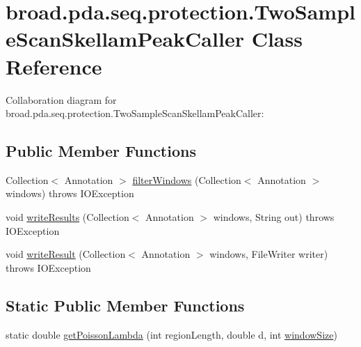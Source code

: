 \hypertarget{classbroad_1_1pda_1_1seq_1_1protection_1_1_two_sample_scan_skellam_peak_caller}{\section{broad.\+pda.\+seq.\+protection.\+Two\+Sample\+Scan\+Skellam\+Peak\+Caller Class Reference}
\label{classbroad_1_1pda_1_1seq_1_1protection_1_1_two_sample_scan_skellam_peak_caller}
}


Collaboration diagram for broad.\+pda.\+seq.\+protection.\+Two\+Sample\+Scan\+Skellam\+Peak\+Caller\+:
\subsection*{Public Member Functions}
\begin{DoxyCompactItemize}
\item 
Collection$<$ Annotation $>$ \hyperlink{classbroad_1_1pda_1_1seq_1_1protection_1_1_two_sample_scan_skellam_peak_caller_a91b82529c1440816b8ac2894162f2066}{filter\+Windows} (Collection$<$ Annotation $>$ windows)  throws I\+O\+Exception 
\item 
void \hyperlink{classbroad_1_1pda_1_1seq_1_1protection_1_1_two_sample_scan_skellam_peak_caller_ab416e62ed4dba266ac883e8d93726462}{write\+Results} (Collection$<$ Annotation $>$ windows, String out)  throws I\+O\+Exception 
\item 
void \hyperlink{classbroad_1_1pda_1_1seq_1_1protection_1_1_two_sample_scan_skellam_peak_caller_ac55e396e1b3dee42bc3babb6b06845ea}{write\+Result} (Collection$<$ Annotation $>$ windows, File\+Writer writer)  throws I\+O\+Exception 
\end{DoxyCompactItemize}
\subsection*{Static Public Member Functions}
\begin{DoxyCompactItemize}
\item 
static double \hyperlink{classbroad_1_1pda_1_1seq_1_1protection_1_1_two_sample_scan_skellam_peak_caller_a1fd8a00c157f21f8fde2572a7b70887d}{get\+Poisson\+Lambda} (int region\+Length, double d, int \hyperlink{classbroad_1_1pda_1_1seq_1_1protection_1_1_two_sample_scan_skellam_peak_caller_a31e1735c164e6abc0e4514648588fb06}{window\+Size})
\end{DoxyCompactItemize}
